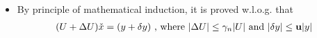 \documentclass[11pt,a4paper]{article}
\begin{document}
\begin{itemize}
\begin{proof}
\begin{align}
{\begin{array}{c|c}
                        0 & U_{(p)} 
                    \end{array} \right)
            }_{U_{(p+1)}}
                +
                \underbrace{
                \left( \begin{array}{c|c}
                        \delta v_{11(p)} &   \delta u_{12(p)}^T \\\hline
                        0 & \Delta U_{(p)} 
                    \end{array} \right)
            }_{\Delta U_{(p+1)}}
                \Bigg)
                \underbrace{
                \left( \begin{array}{c} \cchi_{1(p)} \\\hline \check{x}_{2(p)} \end{array} \right)
            }_{\check{x}_{2(p+1)}}
                &= 
                \Bigg(
                \underbrace{
                \left( \begin{array}{c} \psi_{1(p)} \\\hline
                       y_{2(p)}  \end{array} \right)
            }_{y_{2(p+1)}}
               +
                \underbrace{
                \left( \begin{array}{c}  \delta \psi_{1(p)}  \\\hline
                       \Delta y_{2(p)} \end{array} \right)
            }_{\delta y_{2(p+1)}}
                \Bigg) \\
                (U_{(p+1)} + \Delta U_{(p+1)}) \check{x}_{2(p+1)} 
                &= (y_{2(p+1)} + \delta y_{2(p+1)})
            \end{align}
            where $|\Delta U_{(p+1)} | \leq \gamma_n |U_{(p+1)}|$ 
            and $|\delta y_{2(p+1)}| \leq \bu |y_{2(p+1)}|$.
            \\ Hence, we sucessfully proved \eqref{pp1conclusion}.
        \end{proof}
    \item By principle of mathematical induction, it is proved w.l.o.g. that 
        \begin{align}
            (U + \Delta U) \check{x} = (y + \delta y)
            \text{ , where } |\Delta U | \leq \gamma_n |U| 
            \text{ and } |\delta y| \leq \mathbf{u} |y|
        \end{align}
\end{itemize}
\end{document}
